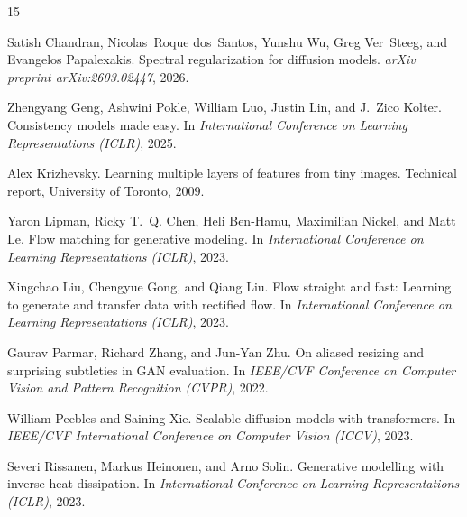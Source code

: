 \documentclass{article}
\begin{document}



\begin{thebibliography}{15}

Satish Chandran, Nicolas~Roque dos~Santos, Yunshu Wu, Greg Ver~Steeg, and Evangelos Papalexakis.
\newblock Spectral regularization for diffusion models.
\newblock \emph{arXiv preprint arXiv:2603.02447}, 2026.

Zhengyang Geng, Ashwini Pokle, William Luo, Justin Lin, and J.~Zico Kolter.
\newblock Consistency models made easy.
\newblock In \emph{International Conference on Learning Representations (ICLR)}, 2025.

Alex Krizhevsky.
\newblock Learning multiple layers of features from tiny images.
\newblock Technical report, University of Toronto, 2009.

Yaron Lipman, Ricky T.~Q. Chen, Heli Ben-Hamu, Maximilian Nickel, and Matt Le.
\newblock Flow matching for generative modeling.
\newblock In \emph{International Conference on Learning Representations (ICLR)}, 2023.

Xingchao Liu, Chengyue Gong, and Qiang Liu.
\newblock Flow straight and fast: Learning to generate and transfer data with rectified flow.
\newblock In \emph{International Conference on Learning Representations (ICLR)}, 2023.

Gaurav Parmar, Richard Zhang, and Jun-Yan Zhu.
\newblock On aliased resizing and surprising subtleties in {GAN} evaluation.
\newblock In \emph{IEEE/CVF Conference on Computer Vision and Pattern Recognition (CVPR)}, 2022.

William Peebles and Saining Xie.
\newblock Scalable diffusion models with transformers.
\newblock In \emph{IEEE/CVF International Conference on Computer Vision (ICCV)}, 2023.

Severi Rissanen, Markus Heinonen, and Arno Solin.
\newblock Generative modelling with inverse heat dissipation.
\newblock In \emph{International Conference on Learning Representations (ICLR)}, 2023.


\end{thebibliography}
\end{document}
